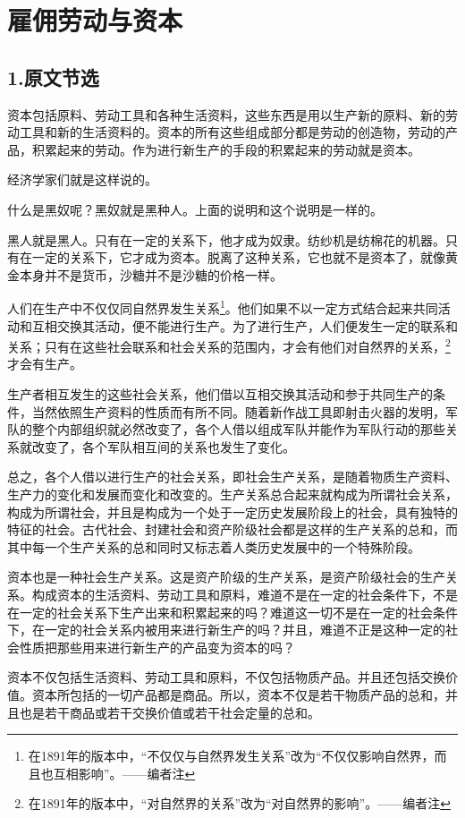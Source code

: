 \documentclass[a4paper,twoside,12pt]{ctexart}
\begin{document}
\newpage
\section{雇佣劳动与资本}

\subsection{1.原文节选}
资本包括原料、劳动工具和各种生活资料，这些东西是用以生产新的原料、新的劳动工具和新的生活资料的。资本的所有这些组成部分都是劳动的创造物，劳动的产品，积累起来的劳动。作为进行新生产的手段的积累起来的劳动就是资本。

经济学家们就是这样说的。

什么是黑奴呢？黑奴就是黑种人。上面的说明和这个说明是一样的。

黑人就是黑人。只有在一定的关系下，他才成为奴隶。纺纱机是纺棉花的机器。只有在一定的关系下，它才成为资本。脱离了这种关系，它也就不是资本了，就像黄金本身并不是货币，沙糖并不是沙糖的价格一样。

人们在生产中不仅仅同自然界发生关系\footnote{在1891年的版本中，“不仅仅与自然界发生关系”改为“不仅仅影响自然界，而且也互相影响”。——编者注}。他们如果不以一定方式结合起来共同活动和互相交换其活动，便不能进行生产。为了进行生产，人们便发生一定的联系和关系；只有在这些社会联系和社会关系的范围内，才会有他们对自然界的关系，\footnote{在1891年的版本中，“对自然界的关系”改为“对自然界的影响”。——编者注}才会有生产。

生产者相互发生的这些社会关系，他们借以互相交换其活动和参于共同生产的条件，当然依照生产资料的性质而有所不同。随着新作战工具即射击火器的发明，军队的整个内部组织就必然改变了，各个人借以组成军队并能作为军队行动的那些关系就改变了，各个军队相互间的关系也发生了变化。

总之，各个人借以进行生产的社会关系，即社会生产关系，是随着物质生产资料、生产力的变化和发展而变化和改变的。生产关系总合起来就构成为所谓社会关系，构成为所谓社会，并且是构成为一个处于一定历史发展阶段上的社会，具有独特的特征的社会。古代社会、封建社会和资产阶级社会都是这样的生产关系的总和，而其中每一个生产关系的总和同时又标志着人类历史发展中的一个特殊阶段。

资本也是一种社会生产关系。这是资产阶级的生产关系，是资产阶级社会的生产关系。构成资本的生活资料、劳动工具和原料，难道不是在一定的社会条件下，不是在一定的社会关系下生产出来和积累起来的吗？难道这一切不是在一定的社会条件下，在一定的社会关系内被用来进行新生产的吗？并且，难道不正是这种一定的社会性质把那些用来进行新生产的产品变为资本的吗？

资本不仅包括生活资料、劳动工具和原料，不仅包括物质产品。并且还包括交换价值。资本所包括的一切产品都是商品。所以，资本不仅是若干物质产品的总和，并且也是若干商品或若干交换价值或若干社会定量的总和。
\end{document}
